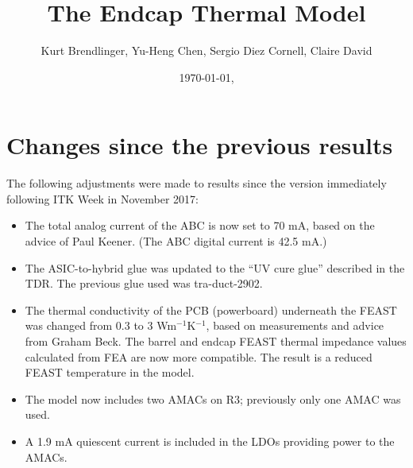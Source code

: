 \documentclass[10pt,]{article}
\title{The Endcap Thermal Model}
\date{\today, \currenttime}
\author{Kurt Brendlinger, Yu-Heng Chen, Sergio Diez Cornell, Claire David}
\begin{document}
\thispagestyle{empty}


\maketitle

\tableofcontents

\section{Changes since the previous results}

The following adjustments were made to results since the version immediately following ITK Week in
November 2017:
\begin{itemize}
\item The total analog current of the ABC is now set to 70 mA, based on the advice of Paul Keener.
(The ABC digital current is 42.5 mA.)
\item The ASIC-to-hybrid glue was updated to the ``UV cure glue'' described in the TDR. The previous
  glue used was tra-duct-2902.
\item The thermal conductivity of the PCB (powerboard) underneath the FEAST was changed from 0.3 to
3 Wm$^{-1}$K$^{-1}$, based on measurements and advice from Graham Beck. The barrel and endcap FEAST
thermal impedance values calculated from FEA are now more compatible. The result is a reduced FEAST
temperature in the model.
\item The model now includes two AMACs on R3; previously only one AMAC was used.
\item A 1.9 mA quiescent current is included in the LDOs providing power to the AMACs.
\end{itemize}




\clearpage

\clearpage

\clearpage

\clearpage
\begin{appendices}

\end{appendices}
\end{document}
